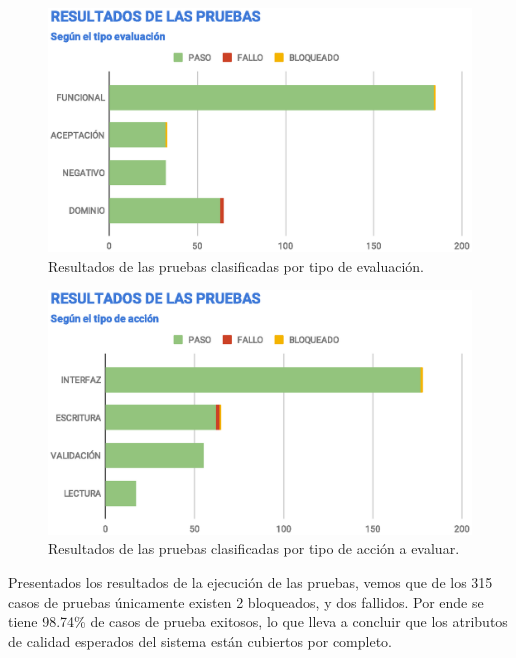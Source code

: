 \begin{figure}[H]
\centering
\includegraphics[width=1.0\textwidth]{graphics/results-tests.eps}
\caption{Resultados de las pruebas clasificadas por tipo de evaluación.}
\label{results-tests}
\end{figure}

\begin{figure}[H]
\centering
\includegraphics[width=1.0\textwidth]{graphics/results-type.eps}
\caption{Resultados de las pruebas clasificadas por tipo de acción a evaluar.}
\label{results-type}
\end{figure}

Presentados los resultados de la ejecución de las pruebas, vemos que de los 315
casos de pruebas únicamente existen 2 bloqueados, y dos fallidos. Por ende se
tiene 98.74\% de casos de prueba exitosos, lo que lleva a concluir que los
atributos de calidad esperados del sistema están cubiertos por completo.

